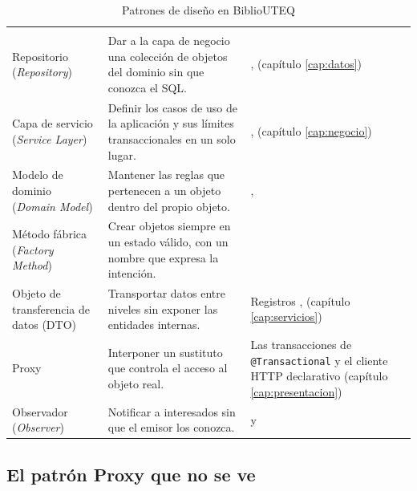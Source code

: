 \begin{xltabular}{\linewidth}{@{}L{3.1cm}YL{4.4cm}@{}}
	\caption{Patrones de diseño en BiblioUTEQ}\label{tab:patrones}\\
	\toprule
	 &  &  \\
	\midrule
	\endfirsthead
	\toprule
	 &  &  \\
	\midrule
	\endhead
	Repositorio (\emph{Repository}) \cite{fowler2002patterns,evans2003domain} & Dar a la capa de negocio una colección de objetos del dominio sin que conozca el SQL. & ,  (capítulo \ref{cap:datos}) \\
	\addlinespace
	Capa de servicio (\emph{Service Layer}) \cite{fowler2002patterns} & Definir los casos de uso de la aplicación y sus límites transaccionales en un solo lugar. & ,  (capítulo \ref{cap:negocio}) \\
	\addlinespace
	Modelo de dominio (\emph{Domain Model}) \cite{fowler2002patterns,evans2003domain} & Mantener las reglas que pertenecen a un objeto dentro del propio objeto. & ,  \\
	\addlinespace
	Método fábrica (\emph{Factory Method}) \cite{gamma1994design} & Crear objetos siempre en un estado válido, con un nombre que expresa la intención. &  \\
	\addlinespace
	Objeto de transferencia de datos (DTO) \cite{fowler2002patterns} & Transportar datos entre niveles sin exponer las entidades internas. & Registros ,  (capítulo \ref{cap:servicios}) \\
	\addlinespace
	Proxy \cite{gamma1994design} & Interponer un sustituto que controla el acceso al objeto real. & Las transacciones de \texttt{@Transactional} y el cliente HTTP declarativo  (capítulo \ref{cap:presentacion}) \\
	\addlinespace
	Observador (\emph{Observer}) \cite{gamma1994design} & Notificar a interesados sin que el emisor los conozca. &  y  \\
	\bottomrule
\end{xltabular}

\subsection{El patrón Proxy que no se ve}

